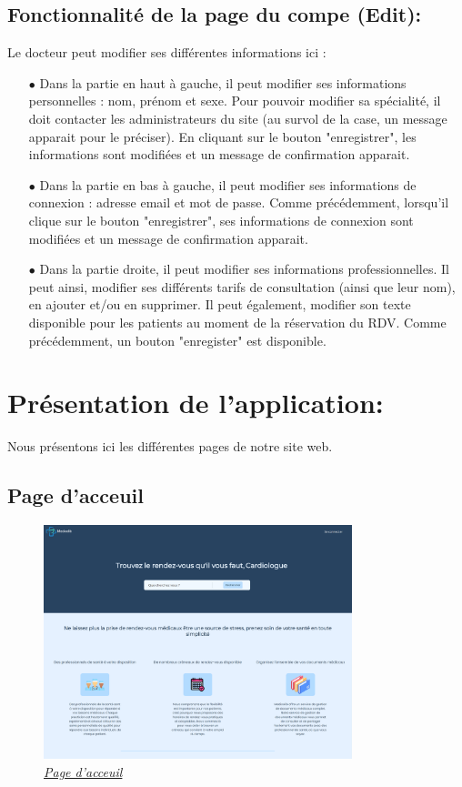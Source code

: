 \documentclass[a4paper]{report}
\begin{document}
\subsection{{Fonctionnalité de la page du compe (Edit)}:}\label{edit2}
Le docteur peut modifier ses différentes informations ici :
\begin{itemize}
    \item[$\bullet$] Dans la partie en haut à gauche, il peut modifier ses informations personnelles : nom, prénom et sexe. Pour pouvoir modifier sa spécialité,
    il doit contacter les administrateurs du site (au survol de la case, un message apparait pour le préciser). En cliquant sur le bouton "enregistrer", les informations sont 
    modifiées et un message de confirmation apparait.
    \item[$\bullet$] Dans la partie en bas à gauche, il peut modifier ses informations de connexion : adresse email et mot de passe. Comme précédemment, lorsqu'il clique sur le bouton "enregistrer", ses
    informations de connexion sont modifiées et un message de confirmation apparait.
    \item[$\bullet$] Dans la partie droite, il peut modifier ses informations professionnelles. Il peut ainsi, modifier ses différents tarifs de consultation (ainsi que leur nom), en ajouter et/ou 
    en supprimer. Il peut également, modifier son texte disponible pour les patients au moment de la réservation du RDV. Comme précédemment, un bouton "enregister" est disponible.
\end{itemize}
\vspace{1cm}

\section{{\noindent Présentation de l'application: }}
\vspace{0.6cm}
Nous présentons ici les différentes pages de notre site web.

\subsection{Page d'acceuil}
\begin{figure}[H]
    \vspace{-10pt}
    \centering
    \includegraphics[width=0.8\textwidth]{captures/page-acceuil.png}
    \caption{\textit{\hyperref[homepage]{Page d'acceuil}}}
    \label{fig:DCU10}
\end{figure}
\end{document}
